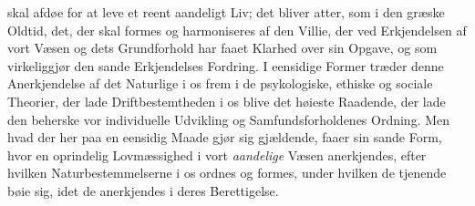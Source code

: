 \documentclass[12pt,a4paper,openany]{book}
\begin{document}
skal afdøe for at leve et reent aandeligt Liv; det bliver atter,
som i den græske Oldtid, det, der skal formes og harmoniseres
af den Villie, der ved Erkjendelsen af vort Væsen og dets
Grundforhold har faaet Klarhed over sin Opgave, og som
virkeliggjør den sande Erkjendelses Fordring. I eensidige
Former træder denne Anerkjendelse af det Naturlige i os frem
i de psykologiske, ethiske og sociale Theorier, der lade Driftbestemtheden
i os blive det høieste Raadende, der lade den
beherske vor individuelle Udvikling og Samfundsforholdenes
Ordning. Men hvad der her paa en eensidig Maade gjør
sig gjældende, faaer sin sande Form, hvor en oprindelig
Lovmæssighed i vort \emph{aandelige} Væsen anerkjendes, efter
hvilken Naturbestemmelserne i os ordnes og formes, under
hvilken de tjenende bøie sig, idet de anerkjendes i deres
Berettigelse.
\end{document}
